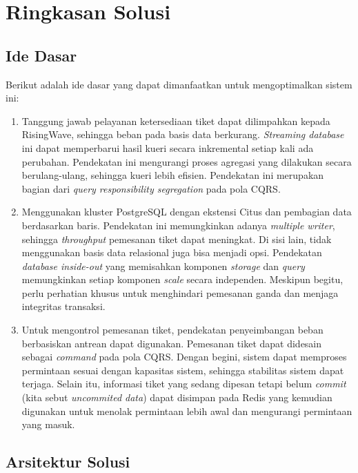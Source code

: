 \section{Ringkasan Solusi}

\subsection{Ide Dasar}

Berikut adalah ide dasar yang dapat dimanfaatkan untuk mengoptimalkan sistem ini:

\begin{enumerate}
  \item Tanggung jawab pelayanan ketersediaan tiket dapat dilimpahkan kepada RisingWave, sehingga beban pada basis data berkurang. \textit{Streaming database} ini dapat memperbarui hasil kueri secara inkremental setiap kali ada perubahan. Pendekatan ini mengurangi proses agregasi yang dilakukan secara berulang-ulang, sehingga kueri lebih efisien. Pendekatan ini merupakan bagian dari \textit{query responsibility segregation} pada pola CQRS.
  \item Menggunakan kluster PostgreSQL dengan ekstensi Citus dan pembagian data berdasarkan baris. Pendekatan ini memungkinkan adanya \textit{multiple writer}, sehingga \textit{throughput} pemesanan tiket dapat meningkat. Di sisi lain, tidak menggunakan basis data relasional juga bisa menjadi opsi. Pendekatan \textit{database inside-out} yang memisahkan komponen \textit{storage} dan \textit{query} memungkinkan setiap komponen \textit{scale} secara independen. Meskipun begitu, perlu perhatian khusus untuk menghindari pemesanan ganda dan menjaga integritas transaksi.
  \item Untuk mengontrol pemesanan tiket, pendekatan penyeimbangan beban berbasiskan antrean dapat digunakan. Pemesanan tiket dapat didesain sebagai \textit{command} pada pola CQRS. Dengan begini, sistem dapat memproses permintaan sesuai dengan kapasitas sistem, sehingga stabilitas sistem dapat terjaga. Selain itu, informasi tiket yang sedang dipesan tetapi belum \textit{commit} (kita sebut \textit{uncommited data}) dapat disimpan pada Redis yang kemudian digunakan untuk menolak permintaan lebih awal dan mengurangi permintaan yang masuk.
\end{enumerate}

\subsection{Arsitektur Solusi}

